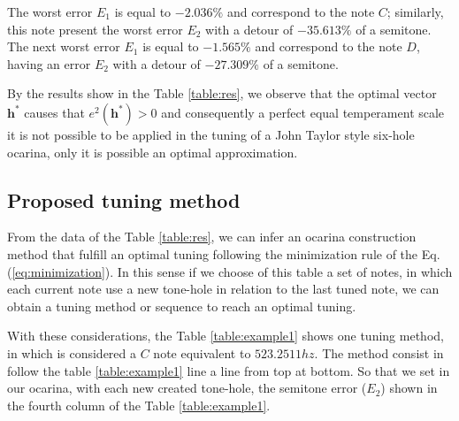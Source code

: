 \documentclass[11pt,twocolumn]{article}
\begin{document}
The worst error $E_1$ is equal to $-2.036\%$ and correspond to the note $C$; 
similarly, this note present the worst error $E_2$ with a detour of $-35.613\%$ of a semitone. 
The next worst error $E_1$ is equal to $-1.565\%$ and correspond to the note $D$,
having an error $E_2$ with a detour of $-27.309\%$ of a semitone.

By the results show in the Table \ref{table:res}, we observe that 
the optimal vector $\mathbf{h^*}$ causes that $e^2(\mathbf{h^*})> 0$
and consequently a perfect equal temperament scale 
it is not possible to be applied in the tuning of a John Taylor style six-hole ocarina,
only it is possible an optimal approximation. 

\subsection{Proposed tuning method}
From the data of the Table \ref{table:res}, 
we can infer an ocarina construction method that fulfill 
an optimal tuning following the minimization rule of the Eq. (\ref{eq:minimization}).
In this sense if we choose of this table a set of notes, 
in which each current note use a new tone-hole in relation to the last tuned note, 
we can obtain a tuning method or sequence to reach an optimal tuning.

With these considerations, the Table \ref{table:example1} shows one tuning method, 
in which is considered a $C$ note equivalent to $523.2511 hz$.
The method consist in follow the table \ref{table:example1} line a line from top at bottom. 
So that we set in our ocarina, with each new created tone-hole, 
the semitone error ($E_2$) shown in the fourth column of the Table \ref{table:example1}.
\end{document}
